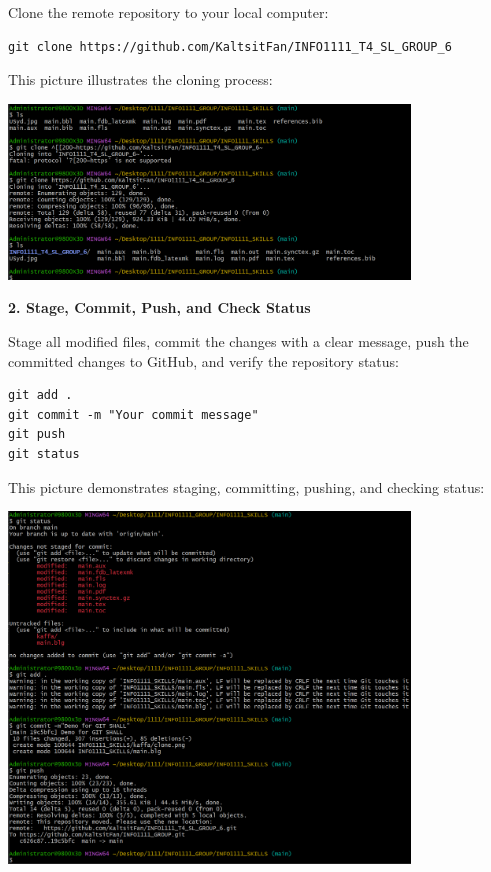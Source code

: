 \documentclass[a4paper, 11pt]{report}
\begin{document}
Clone the remote repository to your local computer:
\begin{verbatim}
git clone https://github.com/KaltsitFan/INFO1111_T4_SL_GROUP_6
\end{verbatim}

This picture illustrates the cloning process: 

\begin{center}
\includegraphics[width=0.8\textwidth]{kaffa/clone.png}
\end{center}

\textbf{2. Stage, Commit, Push, and Check Status}

Stage all modified files, commit the changes with a clear message, push the committed changes to GitHub, and verify the repository status:

\begin{verbatim}
git add .
git commit -m "Your commit message"
git push
git status
\end{verbatim}

This picture demonstrates staging, committing, pushing, and checking status:

\begin{center}
\includegraphics[width=0.8\textwidth]{kaffa/push.png}
\end{center}
\end{document}
